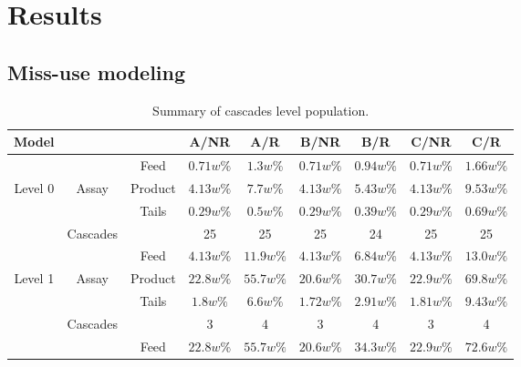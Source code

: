 \section{Results}

\subsection{Miss-use modeling}

\begin{table}[h!]
\centering
  \caption{Summary of cascades level population.}
\begin{tabular}{ccccccccc}
\toprule

Model       &        &           & A/NR      & A/R       & B/NR      & B/R      & C/NR       & C/R          \\
\midrule                                                                                                 
        &            & Feed      & $0.71w\%$ & $1.3w\%$  & $0.71w\%$ & $0.94w\%$ & $0.71w\%$ & $1.66w\%$ \\
Level 0 & Assay      & Product   & $4.13w\%$ & $7.7w\%$  & $4.13w\%$ & $5.43w\%$ & $4.13w\%$ & $9.53w\%$ \\
        &            & Tails     & $0.29w\%$ & $0.5w\%$  & $0.29w\%$ & $0.39w\%$ & $0.29w\%$ & $0.69w\%$ \\
        & Cascades   &           & 25        & 25        & 25        & 24        & 25        & 25        \\
\midrule                                                                                                 
        &            & Feed      & $4.13w\%$ & $11.9w\%$ & $4.13w\%$ & $6.84w\%$ & $4.13w\%$ & $13.0w\%$ \\
Level 1 & Assay      & Product   & $22.8w\%$ & $55.7w\%$ & $20.6w\%$ & $30.7w\%$ & $22.9w\%$ & $69.8w\%$ \\
        &            & Tails     & $1.8w\%$  & $6.6w\%$  & $1.72w\%$ & $2.91w\%$ & $1.81w\%$ & $9.43w\%$ \\
        & Cascades   &           & 3         & 4         & 3         & 4         & 3         & 4         \\
\midrule                                                                                                 
        &            & Feed      & $22.8w\%$ & $55.7w\%$ & $20.6w\%$ & $34.3w\%$ & $22.9w\%$ & $72.6w\%$ \\

\end{tabular}
\end{table}
